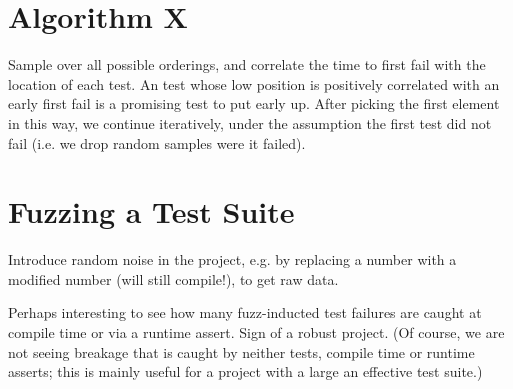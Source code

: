 \documentclass[12pt]{article}
\begin{document}
\section{Algorithm X}

Sample over all possible orderings, and correlate the time to first fail with the location of each test. An test whose low position is positively correlated with an early first fail is a promising test to put early up. After picking the first element in this way, we continue iteratively, under the assumption the first test did not fail (i.e. we drop random samples were it failed).

\section{Fuzzing a Test Suite}

Introduce random noise in the project, e.g. by replacing a number with a modified number (will still compile!), to get raw data.

Perhaps interesting to see how many fuzz-inducted test failures are caught at compile time or via a runtime assert. Sign of a robust project. (Of course, we are not seeing breakage that is caught by neither tests, compile time or runtime asserts; this is mainly useful for a project with a large an effective test suite.)

%
%
\end{document}
